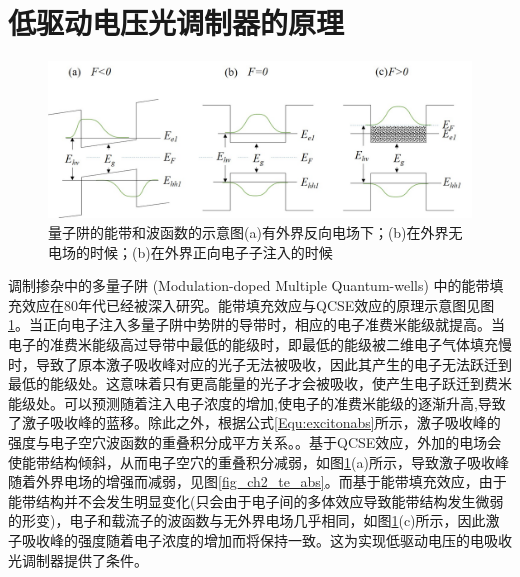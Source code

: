 \section{低驱动电压光调制器的原理}
\begin{figure}[htb]
	\centering
	\includegraphics[width=14cm]{./Pictures/fig_ch4_bandfilling_diag.jpg}
	\caption{ 量子阱的能带和波函数的示意图(a)有外界反向电场下；(b)在外界无电场的时候；(b)在外界正向电子子注入的时候}
	\label{fig_ch4_band_lineup}
\end{figure}
调制掺杂中的多量子阱 (Modulation-doped Multiple Quantum-wells) 中的能带填充效应在80年代已经被深入研究\cite{livescu1988free}。能带填充效应与QCSE效应的原理示意图见图\ref{fig_ch4_band_lineup}。当正向电子注入多量子阱中势阱的导带时，相应的电子准费米能级就提高。当电子的准费米能级高过导带中最低的能级时，即最低的能级被二维电子气体填充慢时，导致了原本激子吸收峰对应的光子无法被吸收，因此其产生的电子无法跃迁到最低的能级处。这意味着只有更高能量的光子才会被吸收，使产生电子跃迁到费米能级处。可以预测随着注入电子浓度的增加,使电子的准费米能级的逐渐升高,导致了激子吸收峰的蓝移。除此之外，根据公式\ref{Equ:excitonabs}所示，激子吸收峰的强度与电子空穴波函数的重叠积分成平方关系。。基于QCSE效应，外加的电场会使能带结构倾斜，从而电子空穴的重叠积分减弱，如图\ref{fig_ch4_band_lineup}(a)所示，导致激子吸收峰随着外界电场的增强而减弱，见图\ref{fig_ch2_te_abs}。而基于能带填充效应，由于能带结构并不会发生明显变化(只会由于电子间的多体效应导致能带结构发生微弱的形变\cite{livescu1988free})，电子和载流子的波函数与无外界电场几乎相同，如图\ref{fig_ch4_band_lineup}(c)所示，因此激子吸收峰的强度随着电子浓度的增加而将保持一致。这为实现低驱动电压的电吸收光调制器提供了条件。


